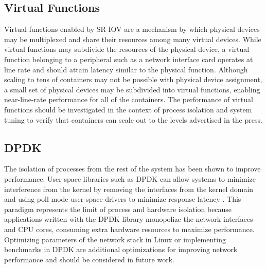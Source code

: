 \subsection{Virtual Functions} %
\label{sec:futurevirtualfunctions}
Virtual functions enabled by SR-IOV are a mechanism by which physical devices may be multiplexed and share their resources among many virtual devices.  
While virtual functions may subdivide the resources of the physical device, a virtual function belonging to a peripheral such as a network interface card operates at line rate and should attain latency similar to the physical function.  
Although scaling to tens of containers may not be possible with physical device assignment, a small set of physical devices may be subdivided into virtual functions, enabling near-line-rate performance for all of the containers.  
The performance of virtual functions should be investigated in the context of process isolation and system tuning to verify that containers can scale out to the levels advertised in the press.  

\subsection{DPDK} %
\label{sec:futuredpdk}
The isolation of processes from the rest of the system has been shown to improve performance.
User space libraries such as DPDK can allow systems to minimize interference from the kernel by removing the interfaces from the kernel domain and using poll mode user space drivers to minimize response latency \autocite{_dpdk_1}.  
This paradigm represents the limit of process and hardware isolation because applications written with the DPDK library monopolize the network interfaces and CPU cores, consuming extra hardware resources to maximize performance.
Optimizing parameters of the network stack in Linux or implementing benchmarks in DPDK are additional optimizations for improving network performance and should be considered in future work.

